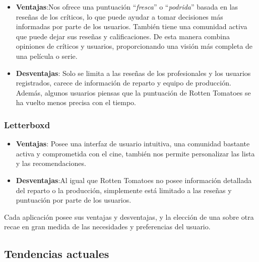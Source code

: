 \begin{itemize}
    \item \textbf{Ventajas}:Nos ofrece una puntuación ``\textit{fresca}'' o ``\textit{podrida}'' basada 
    en las reseñas de los críticos, lo que puede ayudar a tomar decisiones más informadas por parte de 
    los usuarios. También tiene una comunidad activa que puede dejar sus reseñas y calificaciones. De 
    esta manera combina opiniones de críticos y usuarios, proporcionando una visión más completa de una 
    película o serie.
    \item \textbf{Desventajas}: Solo se limita a las reseñas de los profesionales y los usuarios 
    registrados, carece de información de reparto y equipo de producción. Además, algunos usuarios 
    piensas que la puntuación de Rotten Tomatoes se ha vuelto menos precisa con el tiempo.
\end{itemize}

\subsubsection{Letterboxd}

\begin{itemize}
    \item \textbf{Ventajas}: Posee una interfaz de usuario intuitiva, una comunidad bastante activa y 
    comprometida con el cine, también nos permite personalizar las lista y las recomendaciones.
    \item \textbf{Desventajas}:Al igual que Rotten Tomatoes no posee información detallada del reparto 
    o la producción, simplemente está limitado a las reseñas y puntuación por parte de los usuarios.
\end{itemize}

Cada aplicación posee sus ventajas y desventajas, y la elección de una sobre otra recae en gran medida 
de las necesidades y preferencias del usuario.

\subsection{Tendencias actuales}

